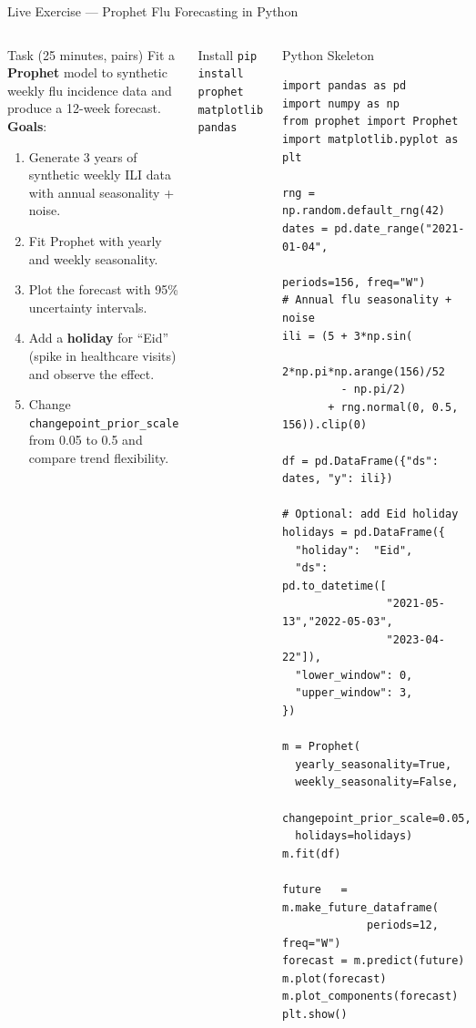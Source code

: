 \documentclass[aspectratio=169,10pt]{beamer}
\begin{document}
\begin{frame}[fragile]{Live Exercise — Prophet Flu Forecasting in Python}
  \begin{columns}[T]
      \begin{block}{Task (25 minutes, pairs)}
        Fit a \textbf{Prophet} model to synthetic weekly flu
        incidence data and produce a 12-week forecast.\\[5pt]
        \textbf{Goals}:
        \begin{enumerate}\setlength\itemsep{1pt}
          \item Generate 3 years of synthetic weekly ILI data
                with annual seasonality + noise.
          \item Fit Prophet with yearly and weekly seasonality.
          \item Plot the forecast with 95\% uncertainty intervals.
          \item Add a \textbf{holiday} for ``Eid'' (spike in
                healthcare visits) and observe the effect.
          \item Change \texttt{changepoint\_prior\_scale}
                from 0.05 to 0.5 and compare trend flexibility.
        \end{enumerate}
      \end{block}
      \vspace{4pt}
      \begin{exampleblock}{Install}
        \scriptsize\texttt{pip install prophet matplotlib pandas}
      \end{exampleblock}

      \begin{exampleblock}{Python Skeleton}
        \scriptsize
        \begin{verbatim}
import pandas as pd
import numpy as np
from prophet import Prophet
import matplotlib.pyplot as plt

rng = np.random.default_rng(42)
dates = pd.date_range("2021-01-04",
                       periods=156, freq="W")
# Annual flu seasonality + noise
ili = (5 + 3*np.sin(
         2*np.pi*np.arange(156)/52
         - np.pi/2)
       + rng.normal(0, 0.5, 156)).clip(0)

df = pd.DataFrame({"ds": dates, "y": ili})

# Optional: add Eid holiday
holidays = pd.DataFrame({
  "holiday":  "Eid",
  "ds":       pd.to_datetime([
                "2021-05-13","2022-05-03",
                "2023-04-22"]),
  "lower_window": 0,
  "upper_window": 3,
})

m = Prophet(
  yearly_seasonality=True,
  weekly_seasonality=False,
  changepoint_prior_scale=0.05,
  holidays=holidays)
m.fit(df)

future   = m.make_future_dataframe(
             periods=12, freq="W")
forecast = m.predict(future)
m.plot(forecast)
m.plot_components(forecast)
plt.show()
        \end{verbatim}
      \end{exampleblock}
  \end{columns}
\end{frame}
\end{document}

